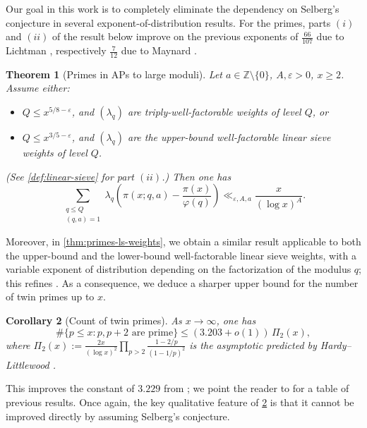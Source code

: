 \documentclass[reqno,11pt]{amsart}
\newtheorem{theorem}{Theorem}[section]
\newtheorem{corollary}[theorem]{Corollary}
\theoremstyle{remark}
\numberwithin{equation}{section}
\newcommand{\Z}{\mathbb{Z}}
\newcommand{\eps}{\varepsilon}
\begin{document}
Our goal in this work is to completely eliminate the dependency on Selberg's conjecture in several exponent-of-distribution results. For the primes, parts $(i)$ and $(ii)$ of the result below improve on the previous exponents of $\tfrac{66}{107}$ due to Lichtman \cite{lichtman2023primes}, respectively $\tfrac{7}{12}$ due to Maynard \cite{maynard2015small}.

\begin{theorem}[Primes in APs to large moduli] \label{thm:primes}
    Let $a \in \Z \setminus \{0\}$, $A, \eps > 0$, $x \ge 2$. Assume either:
    \begin{itemize} 
        \item[$(i)$.] $Q \le x^{5/8-\eps}$, and $(\lambda_q)$ are triply-well-factorable weights of level $Q$, or
        \item[$(ii)$.] $Q \le x^{3/5-\eps}$, and $(\lambda_q)$ are the upper-bound well-factorable  linear sieve weights of level $Q$.
    \end{itemize}
    (See \cref{def:linear-sieve} for part $(ii)$.) Then one has
    \begin{equation} \label{eq:primes-in-ap}
        \sum_{\substack{q \le Q \\ (q, a) = 1}} 
        \lambda_q \left(\pi(x; q, a) - \frac{\pi(x)}{\varphi(q)}\right) \ll_{\eps,A,a}
        \frac{x}{(\log x)^A}.
    \end{equation}
\end{theorem}

Moreover, in \cref{thm:primes-ls-weights}, we obtain a similar result applicable to both the upper-bound and the lower-bound well-factorable linear sieve weights, with a variable exponent of distribution depending on the factorization of the modulus $q$; this refines \cite[Proposition 6.6]{lichtman2023primes}.
As a consequence, we deduce a sharper upper bound for the number of twin primes up to $x$.

\begin{corollary}[Count of twin primes] \label{cor:twin-primes}
As $x \to \infty$, one has
\[
    \#\{p \le x : p, p+2 \text{ are prime}\} \le (3.203 + o(1))\, \Pi_2(x),
\]
where $\Pi_2(x) := \tfrac{2x}{(\log x)^2} \prod_{p > 2} \tfrac{1 - 2/p}{(1 - 1/p)^2}$ is the asymptotic predicted by Hardy--Littlewood \cite{hardy1923problems}.
\end{corollary}

This improves the constant of $3.229$ from \cite[Theorem 1.1]{lichtman2023primes}; we point the reader to \cite[p.\,2]{lichtman2023primes} for a table of previous results. Once again, the key qualitative feature of \cref{cor:twin-primes} is that it cannot be improved directly by assuming Selberg's conjecture.
\end{document}
